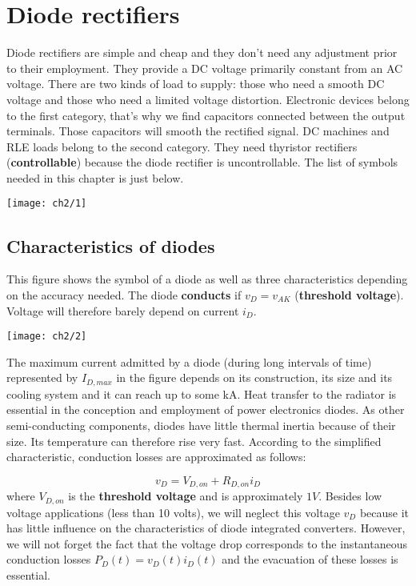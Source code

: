 
\chapter{Diode rectifiers}
	
	Diode rectifiers are simple and cheap and they don't need any adjustment prior to their employment. They provide a DC voltage primarily constant from an AC voltage. There are two kinds of load to supply: those who need a smooth DC voltage and those who need a limited voltage distortion. Electronic devices belong to the first category, that's why we find capacitors connected between the output terminals. Those capacitors will smooth the rectified signal. DC machines and RLE loads belong to the second category. They need thyristor rectifiers (\textbf{controllable}) because the diode rectifier is uncontrollable.
	The list of symbols needed in this chapter is just below.
	
	\begin{center}
	\texttt{[image: ch2/1]}
	\end{center}
	\newpage
	
	\section{Characteristics of diodes}
		This figure shows the symbol of a diode as well as three characteristics depending on the accuracy needed. The diode \textbf{conducts} if $v_D=v_{AK}$ (\textbf{threshold voltage}). Voltage will therefore barely depend on current $i_D$.
		
		\begin{center}
		\texttt{[image: ch2/2]}
		\end{center}			
		
		The maximum current admitted by a diode (during long intervals of time) represented by $I_{D,max}$ in the figure depends on its construction, its size and its cooling system and it can reach up to some kA.
		Heat transfer to the radiator is essential in the conception and employment of power electronics diodes. As other semi-conducting components, diodes have little thermal inertia because of their size. Its temperature can therefore rise very fast.
		According to the simplified characteristic, conduction losses are approximated as follows:
		
		\begin{equation}
			v_D = V_{D,on} + R_{D,on} i_D
		\end{equation}
		where $V_{D,on}$ is the \textbf{threshold voltage} and is approximately $1V$. Besides low voltage applications (less than 10 volts), we will neglect this voltage $v_D$ because it has little influence on the characteristics of diode integrated converters. However, we will not forget the fact that the voltage drop corresponds to the instantaneous conduction losses $P_D(t) = v_D(t)i_D(t)$ and the evacuation of these losses is essential. \\
	

